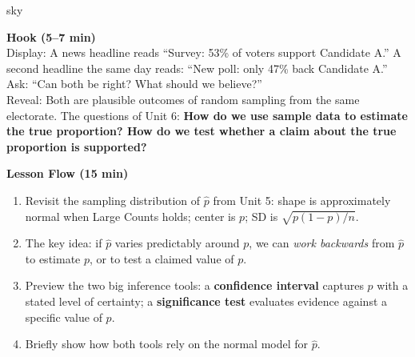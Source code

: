 \documentclass[10pt]{article}
\begin{document}
\begin{skillbox}{sky}
\begin{minipage}[t]{0.48\linewidth}
    \textbf{Hook (5--7 min)}\\
    Display: A news headline reads ``Survey: 53\% of voters support Candidate A.''
    A second headline the same day reads: ``New poll: only 47\% back Candidate A.''\\[4pt]
    Ask: ``Can both be right? What should we believe?''\\[4pt]
    Reveal: Both are plausible outcomes of random sampling from the same electorate.
    The questions of Unit 6: \textbf{How do we use sample data to estimate the true
    proportion? How do we test whether a claim about the true proportion is supported?}
\end{minipage}
\hfill
\begin{minipage}[t]{0.48\linewidth}
    \textbf{Lesson Flow (15 min)}
    \begin{enumerate}
        \item Revisit the sampling distribution of $\hat p$ from Unit 5: shape is
              approximately normal when Large Counts holds; center is $p$; SD is
              $\sqrt{p(1-p)/n}$.
        \item The key idea: if $\hat p$ varies predictably around $p$, we can
              \emph{work backwards} from $\hat p$ to estimate $p$, or to test a
              claimed value of $p$.
        \item Preview the two big inference tools: a \textbf{confidence interval}
              captures $p$ with a stated level of certainty; a \textbf{significance
              test} evaluates evidence against a specific value of $p$.
        \item Briefly show how both tools rely on the normal model for $\hat p$.
    \end{enumerate}
\end{minipage}
\end{skillbox}
\end{document}
